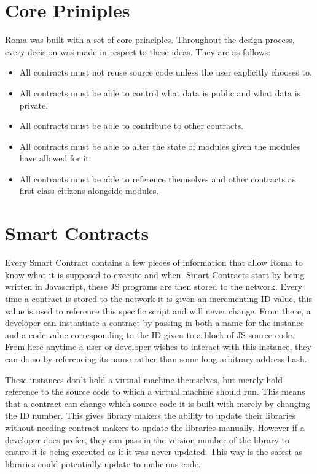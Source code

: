 \documentclass[a4paper]{article}
\begin{document}
\section{Core Priniples}
Roma was built with a set of core principles. Throughout the design process, every decision was made in respect to these ideas. They are as follows:
\begin{itemize}
    \item All contracts must not reuse source code unless the user explicitly chooses to.
    \item All contracts must be able to control what data is public and what data is private.
    \item All contracts must be able to contribute to other contracts.
    \item All contracts must be able to alter the state of modules given the modules have allowed for it.
    \item All contracts must be able to reference themselves and other contracts as first-class citizens alongside modules.
\end{itemize}


\section{Smart Contracts}
Every Smart Contract contains a few pieces of information that allow Roma to know what it is supposed to execute and when. Smart Contracts start by being written in Javascript, these JS programs are then stored to the network. Every time a contract is stored to the network it is given an incrementing ID value, this value is used to reference this specific script and will never change. From there, a developer can instantiate a contract by passing in both a name for the instance and a code value corresponding to the ID given to a block of JS source code. From here anytime a user or developer wishes to interact with this instance, they can do so by referencing its name rather than some long arbitrary address hash.

These instances don't hold a virtual machine themselves, but merely hold reference to the source code to which a virtual machine should run. This means that a contract can change which source code it is built with merely by changing the ID number. This gives library makers the ability to update their libraries without needing contract makers to update the libraries manually. However if a developer does prefer, they can pass in the version number of the library to ensure it is being executed as if it was never updated. This way is the safest as libraries could potentially update to malicious code.
\end{document}
